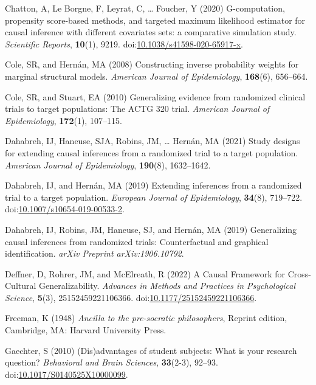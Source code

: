 \documentclass[
  single column]{article}
\newlength{\cslhangindent}
\newenvironment{CSLReferences}[2] %
 {\begin{list}{}{%
  \setlength{\itemindent}{0pt}
  \setlength{\leftmargin}{0pt}
  \setlength{\parsep}{0pt}
  \ifodd #1
   \setlength{\leftmargin}{\cslhangindent}
   \setlength{\itemindent}{-1\cslhangindent}
  \fi
  \setlength{\itemsep}{#2\baselineskip}}}
 {\end{list}}
\begin{document}
\begin{CSLReferences}{1}{0}
Chatton, A, Le Borgne, F, Leyrat, C, \ldots{} Foucher, Y (2020)
G-computation, propensity score-based methods, and targeted maximum
likelihood estimator for causal inference with different covariates
sets: a comparative simulation study. \emph{Scientific Reports},
\textbf{10}(1), 9219.
doi:\href{https://doi.org/10.1038/s41598-020-65917-x}{10.1038/s41598-020-65917-x}.

Cole, SR, and Hernán, MA (2008) Constructing inverse probability weights
for marginal structural models. \emph{American Journal of Epidemiology},
\textbf{168}(6), 656--664.

Cole, SR, and Stuart, EA (2010) Generalizing evidence from randomized
clinical trials to target populations: The ACTG 320 trial.
\emph{American Journal of Epidemiology}, \textbf{172}(1), 107--115.

Dahabreh, IJ, Haneuse, SJA, Robins, JM, \ldots{} Hernán, MA (2021) Study
designs for extending causal inferences from a randomized trial to a
target population. \emph{American Journal of Epidemiology},
\textbf{190}(8), 1632--1642.

Dahabreh, IJ, and Hernán, MA (2019) Extending inferences from a
randomized trial to a target population. \emph{European Journal of
Epidemiology}, \textbf{34}(8), 719--722.
doi:\href{https://doi.org/10.1007/s10654-019-00533-2}{10.1007/s10654-019-00533-2}.

Dahabreh, IJ, Robins, JM, Haneuse, SJ, and Hernán, MA (2019)
Generalizing causal inferences from randomized trials: Counterfactual
and graphical identification. \emph{arXiv Preprint arXiv:1906.10792}.

Deffner, D, Rohrer, JM, and McElreath, R (2022) A Causal Framework for
Cross-Cultural Generalizability. \emph{Advances in Methods and Practices
in Psychological Science}, \textbf{5}(3), 25152459221106366.
doi:\href{https://doi.org/10.1177/25152459221106366}{10.1177/25152459221106366}.

Freeman, K (1948) \emph{Ancilla to the pre-socratic philosophers},
Reprint edition, Cambridge, MA: Harvard University Press.

Gaechter, S (2010) (Dis)advantages of student subjects: What is your
research question? \emph{Behavioral and Brain Sciences},
\textbf{33}(2-3), 92--93.
doi:\href{https://doi.org/10.1017/S0140525X10000099}{10.1017/S0140525X10000099}.


\end{CSLReferences}
\end{document}
